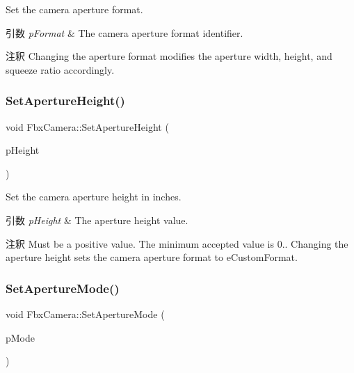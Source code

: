 Set the camera aperture format. 
\begin{DoxyParams}{引数}
{\em p\+Format} & The camera aperture format identifier. \\
\hline
\end{DoxyParams}
\begin{DoxyRemark}{注釈}
Changing the aperture format modifies the aperture width, height, and squeeze ratio accordingly. 
\end{DoxyRemark}
\mbox{\label{class_fbx_camera_a02bdb12abf27b4ccc0c4554818bdbf8f}} 
\subsubsection{\texorpdfstring{Set\+Aperture\+Height()}{SetApertureHeight()}}
{\footnotesize\ttfamily void Fbx\+Camera\+::\+Set\+Aperture\+Height (\begin{DoxyParamCaption}\item[{double}]{p\+Height }\end{DoxyParamCaption})}

Set the camera aperture height in inches. 
\begin{DoxyParams}{引数}
{\em p\+Height} & The aperture height value. \\
\hline
\end{DoxyParams}
\begin{DoxyRemark}{注釈}
Must be a positive value. The minimum accepted value is 0.. Changing the aperture height sets the camera aperture format to e\+Custom\+Format. 
\end{DoxyRemark}
\mbox{\label{class_fbx_camera_a479485801a0795d337d73e25ef8c4477}} 
\subsubsection{\texorpdfstring{Set\+Aperture\+Mode()}{SetApertureMode()}}
{\footnotesize\ttfamily void Fbx\+Camera\+::\+Set\+Aperture\+Mode (\begin{DoxyParamCaption}\item[{\hyperlink{class_fbx_camera_addeea6fc943ce5f087dbc54c142f890e}{E\+Aperture\+Mode}}]{p\+Mode }\end{DoxyParamCaption})}


